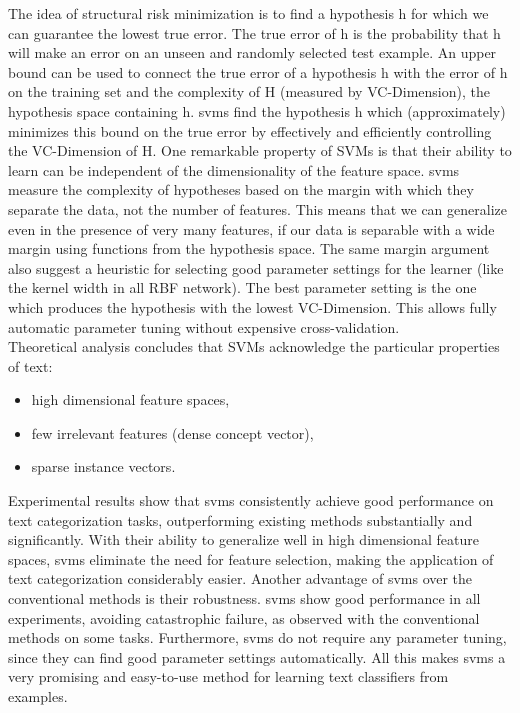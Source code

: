The idea of structural risk minimization is to find a hypothesis h for which we can guarantee the lowest true error.  
The true error of h is the probability that h will make an error on an unseen and randomly selected test example. 
An upper bound can be used to connect the true error of a hypothesis h with the error of h on the training set and the complexity of H (measured by VC-Dimension), the hypothesis space containing h. 
\gls{svm}s find the hypothesis h which (approximately) minimizes this bound on the true error by effectively and efficiently controlling the VC-Dimension of H.
One remarkable property of SVMs is that their ability to learn can be independent of the dimensionality of the feature space. 
\gls{svm}s measure the complexity of hypotheses based on the margin with which they separate the data, not the number of features. 
This means that we can generalize even in the presence of very many features, if our data is separable with a wide margin using functions from the hypothesis space. 
The same margin argument also suggest a heuristic for selecting good parameter settings for the learner (like the kernel width in all RBF network). 
The best parameter setting is the one which produces the hypothesis with the lowest VC-Dimension.
This allows fully automatic parameter tuning without expensive cross-validation. \\
Theoretical analysis concludes that SVMs acknowledge the particular properties of text: 
\begin{itemize}
	\item high dimensional feature spaces, 
	\item few irrelevant features (dense concept vector), 
	\item sparse instance vectors.
\end{itemize}
Experimental results show that \gls{svm}s consistently achieve good performance on text categorization tasks, outperforming existing methods substantially and significantly. 
With their ability to generalize well in high dimensional feature spaces, \gls{svm}s eliminate the need for feature selection, making the application of text categorization considerably easier.
Another advantage of \gls{svm}s over the conventional methods is their robustness. 
\gls{svm}s show good performance in all experiments, avoiding catastrophic failure, as observed with the conventional methods on some tasks. 
Furthermore, \gls{svm}s do not require any parameter tuning, since they can find good parameter settings automatically. 
All this makes \gls{svm}s a very promising and easy-to-use method for learning text classifiers from examples.
\cite{Joachims1998}
 

